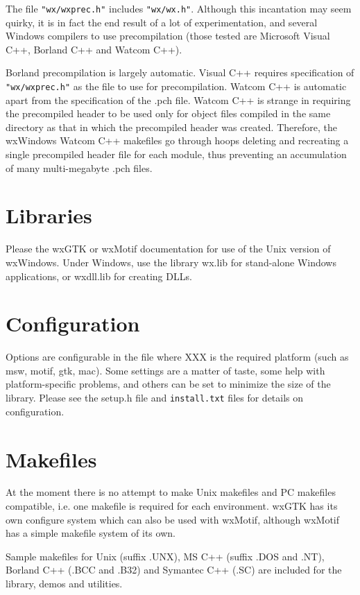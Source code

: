 The file {\tt "wx/wxprec.h"} includes {\tt "wx/wx.h"}. Although this incantation
may seem quirky, it is in fact the end result of a lot of experimentation,
and several Windows compilers to use precompilation (those tested are Microsoft Visual C++, Borland C++
and Watcom C++).

Borland precompilation is largely automatic. Visual C++ requires specification of {\tt "wx/wxprec.h"} as
the file to use for precompilation. Watcom C++ is automatic apart from the specification of
the .pch file. Watcom C++ is strange in requiring the precompiled header to be used only for
object files compiled in the same directory as that in which the precompiled header was created.
Therefore, the wxWindows Watcom C++ makefiles go through hoops deleting and recreating
a single precompiled header file for each module, thus preventing an accumulation of many
multi-megabyte .pch files.

\section{Libraries}

Please the wxGTK or wxMotif documentation for use of the Unix version of wxWindows.
Under Windows, use the library wx.lib for stand-alone Windows
applications, or wxdll.lib for creating DLLs.

\section{Configuration}

Options are configurable in the file
 where XXX is the required platform (such as msw, motif, gtk, mac). Some settings are a matter
of taste, some help with platform-specific problems, and
others can be set to minimize the size of the library. Please see the setup.h file
and {\tt install.txt} files for details on configuration.

\section{Makefiles}

At the moment there is no attempt to make Unix makefiles and
PC makefiles compatible, i.e. one makefile is required for
each environment. wxGTK has its own configure system which can also
be used with wxMotif, although wxMotif has a simple makefile system of its own.

Sample makefiles for Unix (suffix .UNX), MS C++ (suffix .DOS and .NT), Borland
C++ (.BCC and .B32) and Symantec C++ (.SC) are included for the library, demos
and utilities.

